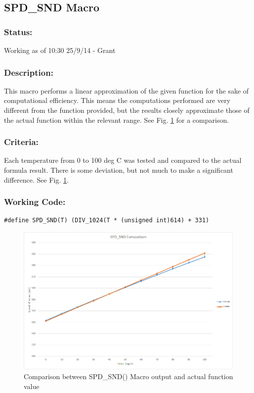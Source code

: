 \documentclass[]{report}
\begin{document}
\subsection{SPD\_SND Macro}
\subsubsection{Status:}
Working as of 10:30 25/9/14 - Grant

\subsubsection{Description:}
This macro performs a linear approximation of the given function for the sake of computational efficiency. This means the computations performed are very different from the function provided, but the results closely approximate those of the actual function within the relevant range. See Fig. \ref{fig:SND_comp} for a comparison.

\subsubsection{Criteria:}
Each temperature from 0 to 100 deg C was tested and compared to the actual formula result. There is some deviation, but not much to make a significant difference. See Fig. \ref{fig:SND_comp}.\newline 

\subsubsection{Working Code:}
\begin{lstlisting}
#define SPD_SND(T) (DIV_1024(T * (unsigned int)614) + 331)
\end{lstlisting}

\begin{figure}
	\centering
	\includegraphics[width=0.7\linewidth]{SND_comp}
	\caption{Comparison between SPD\_SND() Macro output and actual function value}
	\label{fig:SND_comp}
\end{figure}
\end{document}
